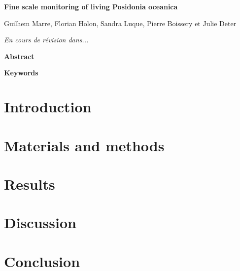 \clearpage

\noindent\textbf{Fine scale monitoring of living Posidonia oceanica}

\noindent Guilhem Marre, Florian Holon, Sandra Luque, Pierre Boissery et Julie Deter

\noindent\textit{En cours de révision dans...}

\noindent\textbf{Abstract}


\noindent\textbf{Keywords}


\section{Introduction}\label{chapitre5_1}

\section{Materials and methods}\label{chapitre5_2}

\section{Results}\label{chapitre5_3}

\section{Discussion}\label{chapitre5_4}

\section{Conclusion}\label{chapitre5_5}
